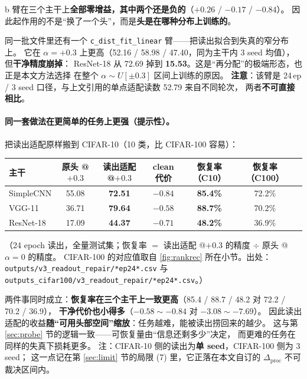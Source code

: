 \documentclass[11pt,a4paper]{ctexart}
\begin{document}
b 臂在三个主干上\textbf{全部零增益，其中两个还是负的}（$+0.26$ / $-0.17$ / $-0.84$）。
因此起作用的不是“换了一个头”，而是\textbf{头是在哪种分布上训练的}。

同一批文件里还有一个 \texttt{c\_dist\_fit\_linear} 臂——把读出拟合到失真的窄分布上。
它在 $\alpha=+0.3$ 上更高（52.16 / 58.98 / 47.40，同为主干内 3 seed 均值），但\textbf{干净精度崩掉}：
ResNet-18 从 72.69 掉到 \textbf{15.53}。这是“再分配”的极端形态，也正是本文方法选择
在整个 $\alpha\sim U[\pm0.3]$ 区间上训练的原因。
\textbf{注意}：该臂是 24\,ep / 3 seed 口径，与上文引用的单点适配读数 52.79 来自不同轮次，
两者\textbf{不可直接相比}。

\paragraph{同一套做法在更简单的任务上更强（提示性）。}
把读出适配原样搬到 CIFAR-10（10 类，比 CIFAR-100 容易）：

\begin{center}
\small
\begin{tabular}{lcccccc}
\toprule
主干 & 原头 @$+0.3$ & 读出适配 @$+0.3$ & clean 代价 & \textbf{恢复率（C10）} & 恢复率（C100） \\
\midrule
SimpleCNN & 55.08 & \textbf{72.51} & $-0.84$ & \textbf{85.4\%} & 72.2\% \\
VGG-11 & 36.71 & \textbf{79.64} & $-0.58$ & \textbf{88.7\%} & 70.2\% \\
ResNet-18 & 17.09 & \textbf{44.37} & $-0.71$ & \textbf{48.2\%} & 36.9\% \\
\bottomrule
\end{tabular}
\end{center}

（24 epoch 读出，全量测试集；恢复率 $=$ 读出适配 @$+0.3$ 的精度 $\div$ 原头 @$\alpha=0$ 的精度。
CIFAR-100 的对应值取自 \cref{fig:rankrec} 所在小节。出处：\texttt{outputs/v3\_readout\_repair/*ep24*.csv}
与 \texttt{outputs\_cifar100/v3\_readout\_repair/*ep24*.csv}。）

两件事同时成立：\textbf{恢复率在三个主干上一致更高}（85.4 / 88.7 / 48.2 对 72.2 / 70.2 / 36.9），
\textbf{干净代价也小得多}（$-0.58\sim-0.84$ 对 $-3.08\sim-7.69$）。
因此读出适配的收益\textbf{随“可用头部空间”缩放}：任务越难，能被读出捞回来的越少。
这与第 \ref{sec:probe} 节的逻辑一致——可恢复量由“信息还剩多少”决定，
而更难的任务在同样的失真下损耗更多。
注：CIFAR-10 侧的读出为\textbf{单 seed}，CIFAR-100 侧为 3 seed；
这一点记在第 \ref{sec:limit} 节的局限 (7) 里，它正落在本文自订的 $\Delta_{\text{proc}}$ 不可裁决区间内。
\end{document}
